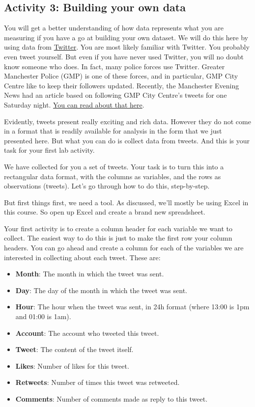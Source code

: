\documentclass[
]{book}
\providecommand{\tightlist}{%
  \setlength{\itemsep}{0pt}\setlength{\parskip}{0pt}}
\begin{document}
\hypertarget{activity-3-building-your-own-data}{%
\subsection{Activity 3: Building your own data}\label{activity-3-building-your-own-data}}

You will get a better understanding of how data represents what you are measuring if you have a go at building your own dataset. We will do this here by using data from \href{https://twitter.com/home}{Twitter}. You are most likely familiar with Twitter. You probably even tweet yourself. But even if you have never used Twitter, you will no doubt know someone who does. In fact, many police forces use Twitter. Greater Manchester Police (GMP) is one of these forces, and in particular, GMP City Centre like to keep their followers updated. Recently, the Manchester Evening News had an article based on following GMP City Centre's tweets for one Saturday night. \href{http://www.manchestereveningnews.co.uk/news/greater-manchester-news/what-police-city-centre-deal-13441129}{You can read about that here}.

Evidently, tweets present really exciting and rich data. However they do not come in a format that is readily available for analysis in the form that we just presented here. But what you can do is collect data from tweets. And this is your task for your first lab activity.

We have collected for you a set of tweets. Your task is to turn this into a rectangular data format, with the columns as variables, and the rows as observations (tweets). Let's go through how to do this, step-by-step.

But first things first, we need a tool. As discussed, we'll mostly be using Excel in this course. So open up Excel and create a brand new spreadsheet.

Your first activity is to create a column header for each variable we want to collect. The easiest way to do this is just to make the first row your column headers. You can go ahead and create a column for each of the variables we are interested in collecting about each tweet. These are:

\begin{itemize}
\tightlist
\item
  \textbf{Month}: The month in which the tweet was sent.
\item
  \textbf{Day}: The day of the month in which the tweet was sent.
\item
  \textbf{Hour}: The hour when the tweet was sent, in 24h format (where 13:00 is 1pm and 01:00 is 1am).
\item
  \textbf{Account}: The account who tweeted this tweet.
\item
  \textbf{Tweet}: The content of the tweet itself.
\item
  \textbf{Likes}: Number of likes for this tweet.
\item
  \textbf{Retweets}: Number of times this tweet was retweeted.
\item
  \textbf{Comments}: Number of comments made as reply to this tweet.
\end{itemize}
\end{document}
